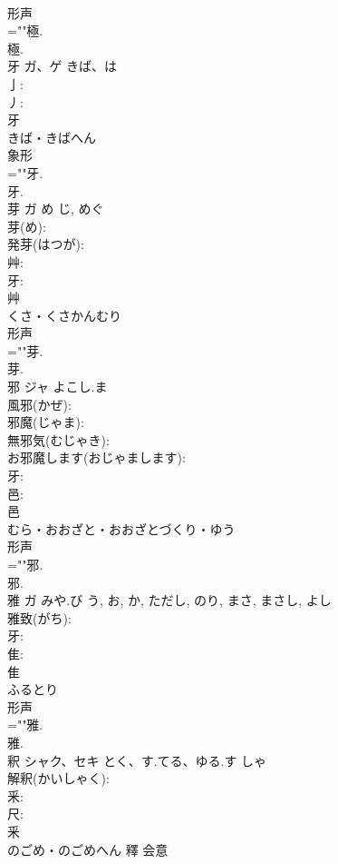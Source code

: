 \documentclass[8pt]{extreport}
\begin{document}
\begin{CJK}{UTF8}{min}
\\	形声 
\\	=""極.
\\	極.
\\	牙	ガ、ゲ	きば、は		
\\	亅: 
\\	丿: 
\\	牙	
\\	きば・きばへん	
\\	象形 
\\	=""牙.
\\	牙.
\\	芽	ガ	め	じ, めぐ	
\\	芽(め): 
\\	発芽(はつが): 
\\	艸: 
\\	牙: 
\\	艸	
\\	くさ・くさかんむり	
\\	形声 
\\	=""芽.
\\	芽.
\\	邪	ジャ	よこし.ま		
\\	風邪(かぜ): 
\\	邪魔(じゃま): 
\\	無邪気(むじゃき): 
\\	お邪魔します(おじゃまします): 
\\	牙: 
\\	邑: 
\\	邑	
\\	むら・おおざと・おおざとづくり・ゆう	
\\	形声 
\\	=""邪.
\\	邪.
\\	雅	ガ	みや.び	う, お, か, ただし, のり, まさ, まさし, よし	
\\	雅致(がち): 
\\	牙: 
\\	隹: 
\\	隹	
\\	ふるとり	
\\	形声 
\\	=""雅.
\\	雅.
\\	釈	シャク、セキ	とく、す.てる、ゆる.す	しゃ	
\\	解釈(かいしゃく): 
\\	釆: 
\\	尺: 
\\	釆	
\\	のごめ・のごめへん	釋	会意 

\end{CJK}
\end{document}
